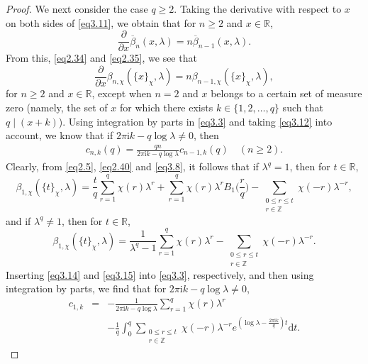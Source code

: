 \documentclass[reqno]{amsart}
\numberwithin{equation}{section}
\begin{document}
\begin{proof}
We next consider the case $q\geqslant2$. Taking the derivative with respect to $x$ on both sides of \eqref{eq3.11}, we obtain that for $n\geqslant2$ and $x\in\mathbb{R}$,
\begin{equation*}
\frac{\partial}{\partial x}\overline{\beta}_{n}(x,\lambda)=n\overline{\beta}_{n-1}(x,\lambda).
\end{equation*}
From this, \eqref{eq2.34} and \eqref{eq2.35}, we see that
\begin{equation}\label{eq3.12}
\frac{\partial}{\partial x}\beta_{n,\chi}(\{x\}_{\chi},\lambda)=n\beta_{n-1,\chi}(\{x\}_{\chi},\lambda),
\end{equation}
for $n\geqslant2$ and $x\in\mathbb{R}$, except when $n=2$ and $x$ belongs to a certain set of measure zero (namely, the set of $x$ for which there exists $k\in\{1,2,\ldots,q\}$ such that $q\mid(x+k)$). Using integration by parts in \eqref{eq3.3} and taking \eqref{eq3.12} into account, we know that if $2\pi\mathrm{i}k-q\log\lambda\neq0$, then
\begin{eqnarray}\label{eq3.13}
c_{n,k}(q)=\frac{qn}{2\pi\mathrm{i}k-q\log\lambda}c_{n-1,k}(q)\quad(n\geqslant2).
\end{eqnarray}
Clearly, from \eqref{eq2.5}, \eqref{eq2.40} and \eqref{eq3.8}, it follows that if $\lambda^{q}=1$, then for $t\in\mathbb{R}$,
\begin{equation}\label{eq3.14}
\beta_{1,\chi}(\{t\}_{\chi},\lambda)=\frac{t}{q}\sum_{r=1}^{q}\chi(r)\lambda^{r}+\sum_{r=1}^{q}\chi(r)\lambda^{r}B_{1}\biggl(\frac{r}{q}\biggl)-\underset{\substack{0\leqslant r\leqslant t\\ r\in\mathbb{Z}}}{\sum}\chi(-r)\lambda^{-r},
\end{equation}
and if $\lambda^{q}\neq1$, then for $t\in\mathbb{R}$,
\begin{equation}\label{eq3.15}
\beta_{1,\chi}(\{t\}_{\chi},\lambda)=\frac{1}{\lambda^{q}-1}\sum_{r=1}^{q}\chi(r)\lambda^{r}-\underset{\substack{0\leqslant r\leqslant t\\ r\in\mathbb{Z}}}{\sum}\chi(-r)\lambda^{-r}.
\end{equation}
Inserting \eqref{eq3.14} and \eqref{eq3.15} into \eqref{eq3.3}, respectively, and then using integration by parts, we find that for $2\pi\mathrm{i}k-q\log\lambda\neq0$,
\begin{eqnarray}\label{eq3.16}
c_{1,k}&=&-\frac{1}{2\pi\mathrm{i}k-q\log\lambda}\sum_{r=1}^{q}\chi(r)\lambda^{r}\nonumber\\
&&-\frac{1}{q}\int_{0}^{q}\underset{\substack{0\leqslant r\leqslant t\\ r\in\mathbb{Z}}}{\sum}\chi(-r)\lambda^{-r}e^{(\log\lambda-\frac{2\pi\mathrm{i}k}{q})t}\text{d}t.

\end{eqnarray}
\end{proof}
\end{document}
